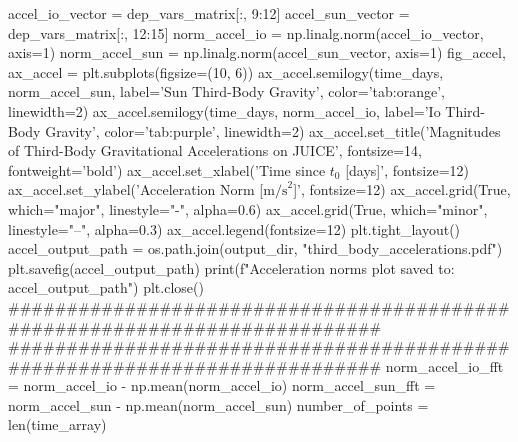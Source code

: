 {}accel_io_vector = dep_vars_matrix[:, 9:12] accel_sun_vector = dep_vars_matrix[:, 12:15]\markdownRendererInterblockSeparator
{}
\markdownRendererSectionEnd \markdownRendererSectionBegin
{}\markdownRendererInterblockSeparator
{}norm_accel_io = np.linalg.norm(accel_io_vector, axis=1) norm_accel_sun = np.linalg.norm(accel_sun_vector, axis=1)\markdownRendererInterblockSeparator
{}
\markdownRendererSectionEnd \markdownRendererSectionBegin
{}\markdownRendererInterblockSeparator
{}fig_accel, ax_accel = plt.subplots(figsize=(10, 6))\markdownRendererInterblockSeparator
{}
\markdownRendererSectionEnd \markdownRendererSectionBegin
{}\markdownRendererInterblockSeparator
{}ax_accel.semilogy(time_days, norm_accel_sun, label='Sun Third-Body Gravity', color='tab:orange', linewidth=2) ax_accel.semilogy(time_days, norm_accel_io, label='Io Third-Body Gravity', color='tab:purple', linewidth=2) ax_accel.set_title('Magnitudes of Third-Body Gravitational Accelerations on JUICE', fontsize=14, fontweight='bold') ax_accel.set_xlabel('Time since $t_0$ [days]', fontsize=12) ax_accel.set_ylabel('Acceleration Norm [$\mathrm{m/s}^2$]', fontsize=12)\markdownRendererInterblockSeparator
{}
\markdownRendererSectionEnd \markdownRendererSectionBegin
{}\markdownRendererInterblockSeparator
{}ax_accel.grid(True, which="major", linestyle="-", alpha=0.6) ax_accel.grid(True, which="minor", linestyle="--", alpha=0.3) ax_accel.legend(fontsize=12)\markdownRendererInterblockSeparator
{}
\markdownRendererSectionEnd \markdownRendererSectionBegin
{}\markdownRendererInterblockSeparator
{}plt.tight_layout()\markdownRendererInterblockSeparator
{}
\markdownRendererSectionEnd \markdownRendererSectionBegin
{}\markdownRendererInterblockSeparator
{}accel_output_path = os.path.join(output_dir, "third_body_accelerations.pdf") plt.savefig(accel_output_path) print(f"Acceleration norms plot saved to: {accel_output_path}") plt.close()\markdownRendererInterblockSeparator
{}###########################################################################\markdownRendererInterblockSeparator
{}
\markdownRendererSectionEnd \markdownRendererSectionBegin
{}\markdownRendererInterblockSeparator
{}########################################################################### norm_accel_io_fft = norm_accel_io - np.mean(norm_accel_io) norm_accel_sun_fft = norm_accel_sun - np.mean(norm_accel_sun) number_of_points = len(time_array)\markdownRendererInterblockSeparator

